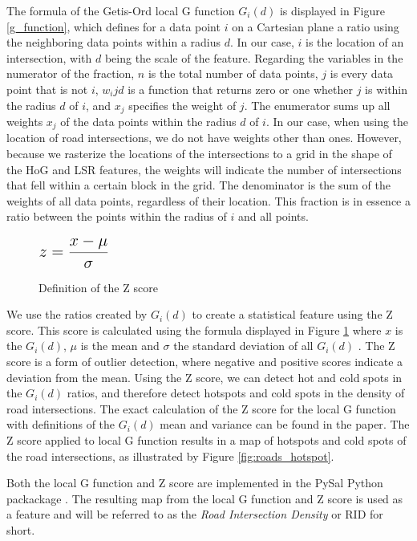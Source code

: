 The formula of the Getis-Ord local G function $G_i(d)$ is displayed in Figure \ref{g_function}, which defines for a data point $i$ on a Cartesian plane a ratio using the neighboring data points within a radius $d$. In our case, $i$ is the location of an intersection, with $d$ being the scale of the feature. Regarding the variables in the numerator of the fraction, $n$ is the total number of data points, $j$ is every data point that is not $i$, $w_ij{d}$ is a function that returns zero or one whether $j$ is within the radius $d$ of $i$, and $x_j$ specifies the weight of $j$. The enumerator sums up all weights $x_j$ of the data points within the radius $d$ of $i$. In our case, when using the location of road intersections, we do not have weights other than ones. However, because we rasterize the locations of the intersections to a grid in the shape of the HoG and LSR features, the weights will indicate the number of intersections that fell within a certain block in the grid. The denominator is the sum of the weights of all data points, regardless of their location. This fraction is in essence a ratio between the points within the radius of $i$ and all points. 

\begin{figure}[h]
	\centering
	$ \mathlarger{\mathlarger{\mathlarger{ z = \frac{x - \mu}{\sigma} }}} $
	\caption{Definition of the Z score}
	\label{z_score}
\end{figure}

We use the ratios created by $G_i(d)$ to create a statistical feature using the Z score. This score is calculated using the formula displayed in Figure \ref{z_score} where $x$ is the $G_i(d)$, $\mu$ is the mean and $\sigma$ the standard deviation of all $G_i(d)$ \cite{kreyszig2010advanced}. The Z score is a form of outlier detection, where negative and positive scores indicate a deviation from the mean. Using the Z score, we can detect hot and cold spots in the $G_i(d)$ ratios, and therefore detect hotspots and cold spots in the density of road intersections. The exact calculation of the Z score for the local G function with definitions of the $G_i(d)$ mean and variance can be found in the paper\cite{getis1992analysis}. The Z score applied to local G function results in a map of hotspots and cold spots of the road intersections, as illustrated by Figure \ref{fig:roads_hotspot}.

Both the local G function and Z score are implemented in the PySal Python packackage \cite{rey2010pysal}. The resulting map from the local G function and Z score is used as a feature and will be referred to as the \textit{Road Intersection Density} or RID for short.





